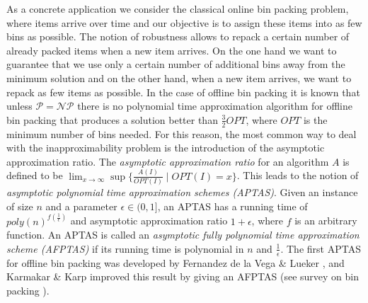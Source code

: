 \documentclass[a4paper,11pt]{article}
\begin{document}
As a concrete application we consider the classical online bin packing problem, 
where items arrive over time and our
objective is to assign these items into as few bins as
possible. The notion of robustness allows to repack a certain number of
already packed items when a new item arrives. 
On the one hand we want to guarantee that we use
only a certain number of additional bins away from the minimum solution
and on the other hand, when a new item arrives, we want to repack as few items as possible.
In the case of offline bin packing 
it is known that unless $\mathcal{P} = \mathcal{NP}$ there is no polynomial time approximation 
algorithm for offline bin packing that produces
a solution better than $\frac{3}{2} \mathit{OPT}$, where $\mathit{OPT}$ is the minimum number
of bins needed. For this reason, the most common way to deal with the inapproximability problem is the 
introduction of the asymptotic approximation ratio. 
The \emph{asymptotic approximation ratio} for an algorithm $A$ is defined to be $\lim_{x \rightarrow \infty} \sup
\{ \frac{A(I)}{\mathit{OPT(I)}} \mid \mathit{OPT(I)} = x \}$.
This leads to the notion of \emph{asymptotic polynomial time approximation schemes (APTAS)}. 
Given an instance of size $n$ and a 
parameter $\epsilon \in (0,1]$, an APTAS has a running time of $\mathit{poly}(n)^{f(\frac{1}{\epsilon})}$ and 
asymptotic approximation
ratio $1+ \epsilon$, where $f$ is an arbitrary function.
An APTAS is called an \emph{asymptotic fully polynomial time approximation scheme (AFPTAS)} if its
running time is polynomial in $n$ and $\frac{1}{\epsilon}$.
The first APTAS for offline bin packing was developed by Fernandez de la Vega \& Lueker \cite{de1981bin},
and Karmakar \& Karp improved this result by giving an AFPTAS \cite{karmarkar1982} (see survey on 
bin packing \cite{coffman1996}).
\end{document}

